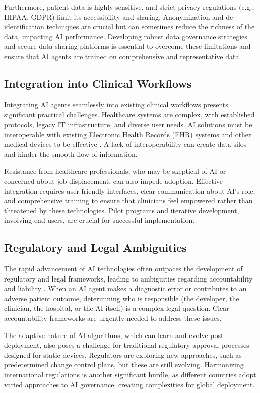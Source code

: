 \documentclass[12pt,a4paper]{article}
\begin{document}
Furthermore, patient data is highly sensitive, and strict privacy regulations (e.g., HIPAA, GDPR) limit its accessibility and sharing. Anonymization and de-identification techniques are crucial but can sometimes reduce the richness of the data, impacting AI performance. Developing robust data governance strategies and secure data-sharing platforms is essential to overcome these limitations and ensure that AI agents are trained on comprehensive and representative data.

\subsection{Integration into Clinical Workflows}
\label{subsec:clinical-integration}
Integrating AI agents seamlessly into existing clinical workflows presents significant practical challenges. Healthcare systems are complex, with established protocols, legacy IT infrastructure, and diverse user needs. AI solutions must be interoperable with existing Electronic Health Records (EHR) systems and other medical devices to be effective \cite{zynxhealth_clinical_decision_support}. A lack of interoperability can create data silos and hinder the smooth flow of information.

Resistance from healthcare professionals, who may be skeptical of AI or concerned about job displacement, can also impede adoption. Effective integration requires user-friendly interfaces, clear communication about AI's role, and comprehensive training to ensure that clinicians feel empowered rather than threatened by these technologies. Pilot programs and iterative development, involving end-users, are crucial for successful implementation.

\subsection{Regulatory and Legal Ambiguities}
\label{subsec:regulatory-ambiguities}
The rapid advancement of AI technologies often outpaces the development of regulatory and legal frameworks, leading to ambiguities regarding accountability and liability \cite{ey_global_regulatory}. When an AI agent makes a diagnostic error or contributes to an adverse patient outcome, determining who is responsible (the developer, the clinician, the hospital, or the AI itself) is a complex legal question. Clear accountability frameworks are urgently needed to address these issues.

The adaptive nature of AI algorithms, which can learn and evolve post-deployment, also poses a challenge for traditional regulatory approval processes designed for static devices. Regulators are exploring new approaches, such as predetermined change control plans, but these are still evolving. Harmonizing international regulations is another significant hurdle, as different countries adopt varied approaches to AI governance, creating complexities for global deployment.
\end{document}
